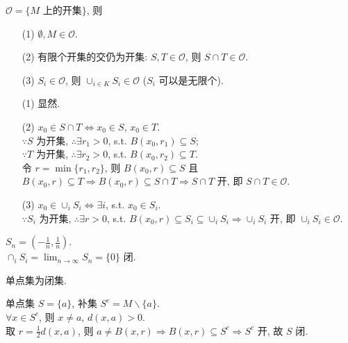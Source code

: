 \documentclass{note}
\begin{document}
\begin{thm}[(课本定理 12.1)]
    $\mathcal{O}=\{M\text{ 上的开集}\}$, 则
    \begin{itemize}
        \item[(1)] $\emptyset,M\in\mathcal{O}$.
        \item[(2)] 有限个开集的交仍为开集: $S,T\in\mathcal{O}$, 则 $S\cap T\in\mathcal{O}$.
        \item[(3)] $S_i\in\mathcal{O}$, 则 $\cup_{i\in K}S_i\in\mathcal{O}$ ($S_i$ 可以是无限个).
    \end{itemize}
\end{thm}
\begin{pf}
    \begin{itemize}
        \item[(1)] 显然.
        \item[(2)] $x_0\in S\cap T\Longleftrightarrow x_0\in S$, $x_0\in T$.\\
        $\because S$ 为开集, $\therefore\exists r_1>0$, s.t. $B(x_0,r_1)\subseteq S$;\\
        $\because T$ 为开集, $\therefore\exists r_2>0$, s.t. $B(x_0,r_2)\subseteq T$.\\
        令 $r=\min\{r_1,r_2\}$, 则 $B(x_0,r)\subseteq S$ 且 $B(x_0,r)\subseteq T\Longrightarrow B(x_0,r)\subseteq S\cap T\Longrightarrow S\cap T$ 开, 即 $S\cap T\in\mathcal{O}$.
        \item[(3)] $x_0\in\cup_iS_i\Longleftrightarrow\exists i$, s.t. $x_0\in S_i$.\\
        $\because S_i$ 为开集, $\therefore\exists r>0$, s.t. $B(x_0,r)\subseteq S_i\subseteq\cup_iS_i\Longrightarrow\cup_iS_i$ 开, 即 $\cup_iS_i\in\mathcal{O}$.
    \end{itemize}
\end{pf}

\begin{eg}[无穷多个开集的交未必开]
    $S_n=\left(-\frac{1}{n},\frac{1}{n}\right)$.\\
    $\cap_iS_i=\lim_{n\rightarrow\infty}S_n=\{0\}$ 闭.
\end{eg}

单点集为闭集.
\begin{pf}
    单点集 $S=\{a\}$, 补集 $S^c=M\backslash\{a\}$.\\
    $\forall x\in S^c$, 则 $x\neq a$, $d(x,a)>0$.\\
    取 $r=\frac{1}{2}d(x,a)$, 则 $a\neq B(x,r)\Longrightarrow B(x,r)\subseteq S^c\Longrightarrow S^c$ 开, 故 $S$ 闭.
\end{pf}
\end{document}
